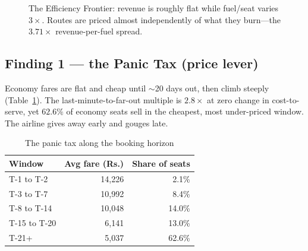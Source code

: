 \documentclass[conference]{IEEEtran}
\newcommand{\INR}{\mbox{Rs.}}
\begin{document}
\begin{figure}[!t]
\centering
{}
\caption{The Efficiency Frontier: revenue is roughly flat while fuel/seat varies $3\times$. Routes are priced almost independently of what they burn---the $3.71\times$ revenue-per-fuel spread.}
\label{fig:frontier}
\end{figure}

\subsection{Finding 1 --- the Panic Tax (price lever)}
Economy fares are flat and cheap until $\sim$20 days out, then climb steeply (Table~\ref{tab:panic}). The last-minute-to-far-out multiple is $2.8\times$ at zero change in cost-to-serve, yet $62.6\%$ of economy seats sell in the cheapest, most under-priced window. The airline gives away early and gouges late.

\begin{table}[!t]
\caption{The panic tax along the booking horizon}
\label{tab:panic}
\centering
\renewcommand{\arraystretch}{1.1}
\begin{tabular}{@{}lrr@{}}
\toprule
\textbf{Window} & \textbf{Avg fare (\INR{})} & \textbf{Share of seats}\\
\midrule
T-1 to T-2 & 14{,}226 & 2.1\%\\
T-3 to T-7 & 10{,}992 & 8.4\%\\
T-8 to T-14 & 10{,}048 & 14.0\%\\
T-15 to T-20 & 6{,}141 & 13.0\%\\
T-21+ & 5{,}037 & 62.6\%\\
\bottomrule
\end{tabular}
\end{table}
\end{document}
